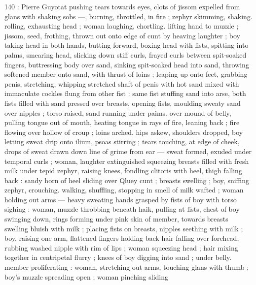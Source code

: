140 : Pierre Guyotat
pushing tears towards eyes, clots of jissom expelled from glans with
shaking sobs —, burning, throttled, in fire ; zephyr skimming,
shaking. rolling, exhausting head ; woman laughing, chortling. lifting
hand to muzzle ; jissom, seed, frothing, thrown out onto edge of cunt
by heaving laughter ; boy taking head in both hands, butting forward,
boxing head with fists, spitting into palms, smearing head, slicking
down stiff curls, frayed curls between spit-soaked fingers,
buttressing body over sand, sinking spit-soaked head into sand,
throwing softened member onto sand, with thrust of loins ; leaping
up onto feet, grabbing penis, stretching, whipping stretched shaft of
penis with hot sand mixed with immaculate cockles flung from other
fist : same fist stuffing sand into arse, both fists filled with sand
pressed over breasts, opening fists, moulding sweaty sand over
nipples ; torso raised, sand running under paims. over mound of
belly, pulling tongue out of mouth, heating tongue in rays of fire,
leaning back ; fire flowing over hollow of croup ; loins arched. hips
askew, shoulders dropped, boy letting sweat drip onto ilium, psoas
stirring ; tears touching, at edge of cheek, drops of sweat drawn
down line of grime from ear — sweat formed, exuded under
temporal curls ; woman, laughter extinguished squeezing breasts
filled with fresh milk under tepid zephyr, raising knees, fondling
clitoris with heel, thigh falling back : sandy horn of heel sliding over
Qluey cunt ; breasts swelling ; boy, sniffing zephyr, crouching.
walking, shuffling, stopping in smell of milk wafted ; woman holding
out arms — heavy sweating hands grasped by fists of boy with torso
sighing : woman, muzzle throbbing beneath haik, pulling at fists,
chest of boy swinging down, rings forming under pink skin of
member, towards breasts swelling bluish with milk ; placing fists on
breasts, nipples seething with milk ; boy, raising one arm, flattened
fingers holding back hair falling over forehead, rubbing washed
nipple with rim of lips ; woman squeezing head ; hair mixing together
in centripetal flurry ; knees of boy digging into sand ; under belly.
member proliferating : woman, stretching out arms, touching glans
with thumb ; boy's muzzle spreading open ; woman pinching sliding

